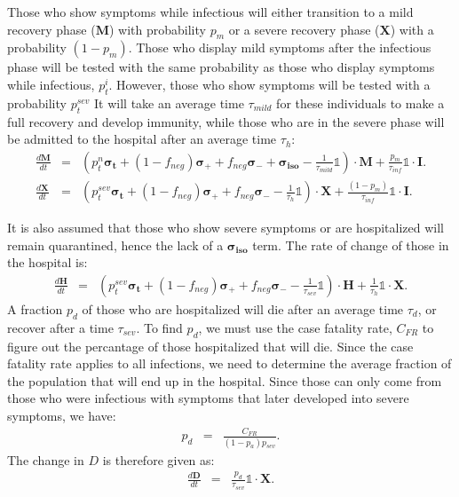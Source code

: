 \documentclass[notitlepage, superscriptaddress]{revtex4-2}
\begin{document}
Those who show symptoms while infectious will either transition to a mild recovery phase ($\boldsymbol{M}$) with probability $p_{m}$ or a severe recovery phase ($\boldsymbol{X}$) with a probability $(1-p_{m})$. Those who display mild symptoms after the infectious phase will be tested with the same probability as those who display symptoms while infectious, $p^{i}_{t}$. However, those who show symptoms will be tested with a probability $p^{sev}_{t}$ It will take an average time $\tau_{mild}$ for these individuals to make a full recovery and develop immunity, while those who are in the severe phase will be admitted to the hospital after an average time $\tau_{h}$:
\begin{eqnarray}
\frac{d \boldsymbol{M}}{dt} &=& \left( p^{n}_{t} \boldsymbol{\sigma_{t}} + (1-f_{neg}) \boldsymbol{\sigma_{+}} + f_{neg} \boldsymbol{\sigma_{-}} + \boldsymbol{\sigma_{iso}} - \frac{1}{\tau_{mild}} \mathbb{1} \right) \cdot \boldsymbol{M} + \frac{p_{m}}{\tau_{inf}} \mathbb{1} \cdot \boldsymbol{I}. \\ 
%
\frac{d \boldsymbol{X}}{dt} &=& \left( p^{sev}_{t} \boldsymbol{\sigma_{t}} + (1-f_{neg}) \boldsymbol{\sigma_{+}} + f_{neg} \boldsymbol{\sigma_{-}} - \frac{1}{\tau_{h}} \mathbb{1} \right) \cdot \boldsymbol{X} + \frac{(1-p_{m})}{\tau_{inf}} \mathbb{1} \cdot \boldsymbol{I}. 
\end{eqnarray}

It is also assumed that those who show severe symptoms or are hospitalized will remain quarantined, hence the lack of a $\boldsymbol{\sigma_{iso}}$ term. The rate of change of those in the hospital is:
\begin{eqnarray}
\frac{d \boldsymbol{H}}{dt} &=& \left( p^{sev}_{t} \boldsymbol{\sigma_{t}} + (1-f_{neg}) \boldsymbol{\sigma_{+}} + f_{neg} \boldsymbol{\sigma_{-}} - \frac{1}{\tau_{sev}} \mathbb{1} \right) \cdot \boldsymbol{H} + \frac{1}{\tau_{h}} \mathbb{1} \cdot \boldsymbol{X}. 
\end{eqnarray}
A fraction $p_{d}$ of those who are hospitalized will die after an average time $\tau_{d}$, or recover after a time $\tau_{sev}$. To find $p_{d}$, we must use the case fatality rate, $C_{FR}$ to figure out the percantage of those hospitalized that will die. Since the case fatality rate applies to all infections, we need to determine the average fraction of the population that will end up in the hospital. Since those can only come from those who were infectious with symptoms that later developed into severe symptoms, we have:
\begin{eqnarray}
p_{d} &=& \frac{C_{FR}}{(1- p_{a}) p_{sev}}.
\end{eqnarray}
The change in $D$ is therefore given as:
\begin{eqnarray}
\frac{d \boldsymbol{D}}{dt} &=& \frac{p_{d}}{\tau_{sev}} \mathbb{1} \cdot \boldsymbol{X}. 
\end{eqnarray}
\end{document}
